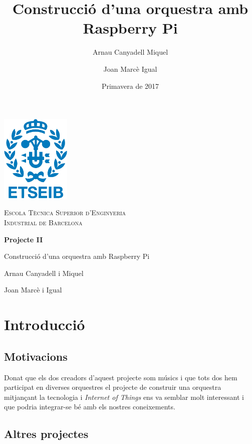 \documentclass[a4paper]{article}
\title{Construcció d'una orquestra amb Raspberry Pi}
\author{Arnau Canyadell Miquel \and Joan Marcè Igual}
\date{Primavera de 2017}
\begin{document}
\begin{titlepage}
	\centering
	\vspace{1cm}
	\includegraphics[width=0.25\textwidth]{images/etseib}
	\par\vspace{1cm}
	\textsc{ \LARGE Escola Tècnica Superior d'Enginyeria \\[1em] 
		Industrial de Barcelona}
	\par\vspace{2cm}
	\textbf{\Huge Projecte II}
	\par\vspace{2cm}
	{\LARGE Construcció d'una orquestra amb Raspberry Pi}
	\vfill
	\begin{flushright}
		\large
		Arnau Canyadell i Miquel \par
		Joan Marcè i Igual \par
	\end{flushright}
\end{titlepage}

\tableofcontents

\newpage

\section{Introducció}

\subsection{Motivacions}

Donat que els dos creadors d'aquest projecte som músics i que tots dos hem participat en diverses orquestres el projecte de construir una orquestra mitjançant la tecnologia i \emph{Internet of Things} ens va semblar molt interessant i que podria integrar-se bé amb els nostres coneixements.

\subsection{Altres projectes}
\end{document}
